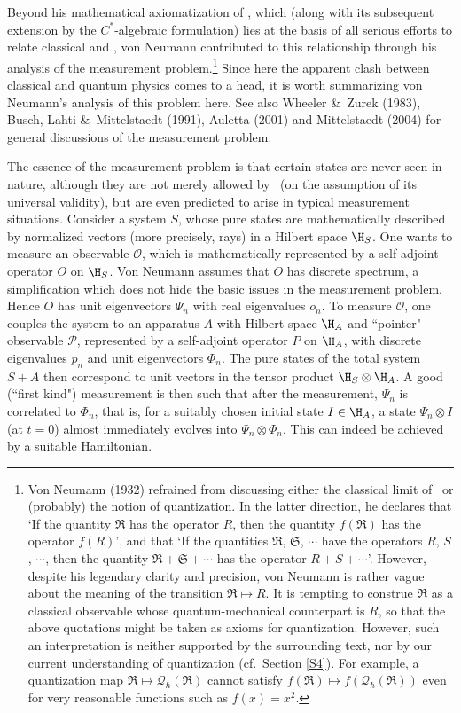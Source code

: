 \documentclass[12pt,titlepage]{article}
\newcommand{\ca}{$C^*$-algebra} \newcommand{\jba}{JB-algebra}
\newcommand{\ot}{\otimes}
\newcommand{\qh}{q_{\hbar}} \newcommand{\sgh}{\sigma_{\hbar}}
\newcommand{\CQ}{{\mathcal Q}} \newcommand{\CR}{{\mathcal R}}
\renewcommand{\qh}{\CQ_{\hbar}}
\begin{document}
Beyond his mathematical axiomatization of \qm, which (along with its subsequent extension by the \ca ic formulation)  lies at the basis of all serious efforts to relate classical and \qm, von Neumann contributed to this relationship through his  analysis of the measurement problem.\footnote{Von Neumann (1932) refrained from discussing either the classical limit of \qm\ or (probably) the notion of quantization.
In the latter direction, he declares that `If the quantity $\mathfrak{R}$ has the operator $R$, then the quantity $f(\mathfrak{R})$ has the operator $f(R)$', and that `If the quantities $\mathfrak{R}$, $\mathfrak{S}$, $\cdots$ have the operators $R$, $S$, $\cdots$, then the quantity $\mathfrak{R}+\mathfrak{S}+\cdots$ has the operator $R+S+\cdots$'.
However, despite his legendary clarity and precision, von Neumann is rather vague about the meaning of the transition $\mathfrak{R}\mapsto R$. It is tempting to construe
 $\mathfrak{R}$  as a classical observable whose quantum-mechanical counterpart is $R$, so that the above quotations might be taken as axioms for quantization. However, 
such an interpretation is neither supported by the surrounding text, nor by our current understanding of quantization (cf.\ Section \ref{S4}). For example, a quantization map $\mathfrak{R}\mapsto \qh(\mathfrak{R})$ cannot satisfy $f(\mathfrak{R})\mapsto f(\qh(\mathfrak{R}))$ even for very reasonable functions such as $f(x)=x^2$.}    Since here the apparent clash between classical and quantum physics comes to a head, it is worth summarizing von Neumann's analysis of this problem here. See also Wheeler \&\ Zurek (1983), Busch, Lahti \&\ Mittelstaedt (1991), Auletta (2001) and Mittelstaedt (2004) for general discussions of the measurement problem.

  The essence of the measurement problem is that certain states are never seen in nature, although they are not merely allowed by \qm\ (on the assumption of its universal validity), but are even predicted to arise in typical measurement situations. Consider a system $S$, whose pure states are mathematically described by normalized vectors (more precisely, rays) in a Hilbert space $\H_S$. One wants to measure an observable $\mathcal{O}$, which is mathematically represented by a self-adjoint operator $O$ on $\H_S$. Von Neumann assumes that $O$ has discrete spectrum,
a simplification which does not hide the basic issues in the measurement
problem. Hence $O$ has unit eigenvectors $\Psi_n$ with real eigenvalues $o_n$. 
To measure $\mathcal{O}$, one couples the system to an apparatus $A$ with
Hilbert space $\H_A$ and ``pointer" observable $\mathcal{P}$, represented
by a self-adjoint operator $P$ on $\H_A$, with discrete eigenvalues
$p_n$ and unit eigenvectors $\Phi_n$. The pure states of the total system $S+A$ then correspond to unit vectors in the tensor product $\H_S\otimes \H_A$.  A good (``first kind") measurement is then such that after the measurement, $\Psi_n$ is correlated to $\Phi_n$, that is, for a suitably chosen initial state $I \in{\H}_A$, a state
 $\Psi_n\ot I$ (at $t=0$) almost immediately evolves into $\Psi_n\ot\Phi_n$. This can indeed be achieved by a suitable Hamiltonian. 
\end{document}
